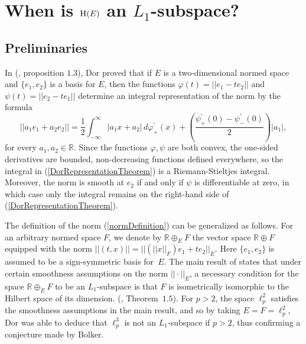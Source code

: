 \documentclass{article}[1100]
\theoremstyle{definition}
\theoremstyle{remark}
\newcommand\ar{\mathbb{R}}
\newcommand\norma[1]{|\!|#1|\!|}
\newcommand\mySpaceH[1]{\textsc{H}(#1)}
\newcommand{\littleE}{\scriptscriptstyle E}
\begin{document}

\section{When is $\mySpaceH{E}$ an $L_1$-subspace?}
\subsection*{Preliminaries}
In (\cite{Dor}, proposition $1.3$),  Dor proved that if $E$ is a two-dimensional normed space and $\{e_1,e_2\}$ is a basis for $E$, then 
the functions ${\varphi(t)=\norma{e_1-te_2}}$ and ${\psi(t)=\norma{e_2-te_1}}$ determine an integral representation of the norm by the formula
\begin{equation}\label{DorRepresentationTheorem}
\norma{a_1e_1+a_2e_2}=\frac{1}{2}\int_{-\infty}^{\infty}|a_1x+a_2|\,d\varphi_{+}^{'}(x)+\left(\frac{\psi_{+}^{'}(0)-\psi_{-}^{'}(0)}{2}\right)|a_1|,
\end{equation}
for every $a_1,a_2\in\ar$. Since the functions $\varphi,\psi$ are both convex, the one-sided derivatives are bounded, non-decreasing
functions defined everywhere, so the integral in (\ref{DorRepresentationTheorem}) is a  Riemann-Stieltjes integral. Moreover,
the norm is smooth at $e_2$ if and only if $\psi$ is differentiable at zero, in which case only the integral remains on the right-hand side of 
(\ref{DorRepresentationTheorem}).

\medskip
The definition of the norm (\ref{normDefinition}) can be generalized as follows. For an arbitrary normed space $F$, 
we denote by $\ar\oplus_{\littleE} F$ the vector space $\ar\oplus F$ equipped with the norm 
$\norma{(t,x)}=\norma{(\norma{x}_{\scriptscriptstyle{F}})e_1+te_2}_{\littleE}$. Here $\{e_1,e_2\}$ is assumed to be a sign-symmetric basis for~$E$.
The main result of \cite{Dor} states that under certain smoothness assumptions on the norm $\norma{\cdot}_{\littleE}$, a necessary condition for the space $\ar\oplus_{\littleE} F$ to be an $L_1$-subspace is that $F$ is isometrically isomorphic to the Hilbert space of its dimension. (\cite{Dor}, Theorem~$1.5$). For $p>2$, the space $\ell_p^2$ satisfies the smoothness assumptions in the main result, and so by taking $E=F=\ell_p^2$,  Dor was able to deduce that $\ell_p^3$ is not an $L_1$-subspace if $p>2$, thus confirming a conjecture made by Bolker.


\medskip
\end{document}
